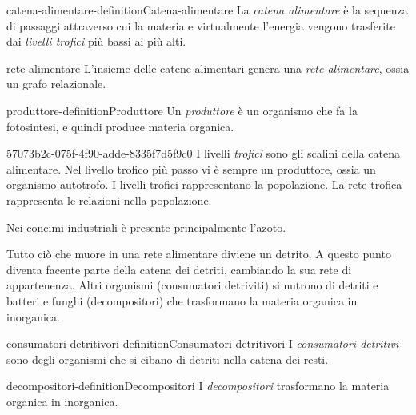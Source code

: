 \documentclass[preview]{standalone}
\begin{document}
\begin{snippetdefinition}{catena-alimentare-definition}{Catena-alimentare}
    La \textit{catena alimentare} è la sequenza di passaggi
    attraverso cui la materia e virtualmente l'energia
    vengono trasferite dai \textit{livelli trofici} più bassi ai più alti.
\end{snippetdefinition}

\begin{snippet}{rete-alimentare}
    L'insieme delle catene alimentari genera una \textit{rete alimentare}, ossia un grafo relazionale.
\end{snippet}

\begin{snippetdefinition}{produttore-definition}{Produttore}
    Un \textit{produttore} è un organismo che fa la fotosintesi, e quindi produce materia organica.
\end{snippetdefinition}

\begin{snippet}{57073b2c-075f-4f90-adde-8335f7d5f9c0}
    I livelli \textit{trofici} sono gli scalini della catena alimentare.
    Nel livello trofico più passo vi è sempre un produttore, ossia un organismo autotrofo.
    I livelli trofici rappresentano la popolazione. La rete trofica rappresenta le relazioni
    nella popolazione.


    Nei concimi industriali è presente principalmente l'azoto.

    Tutto ciò che muore in una rete alimentare diviene un detrito. A questo punto diventa
    facente parte della catena dei detriti, cambiando la sua rete di appartenenza.
    Altri organismi (consumatori detriviti) si nutrono di detriti e batteri e funghi (decompositori) che trasformano la materia organica in inorganica.
\end{snippet}

\begin{snippetdefinition}{consumatori-detritivori-definition}{Consumatori detritivori}
    I \textit{consumatori detritivi} sono degli organismi che si cibano di detriti
    nella catena dei resti.
\end{snippetdefinition}

\begin{snippetdefinition}{decompositori-definition}{Decompositori}
    I \textit{decompositori} trasformano la materia organica in inorganica.
\end{snippetdefinition}
\end{document}
